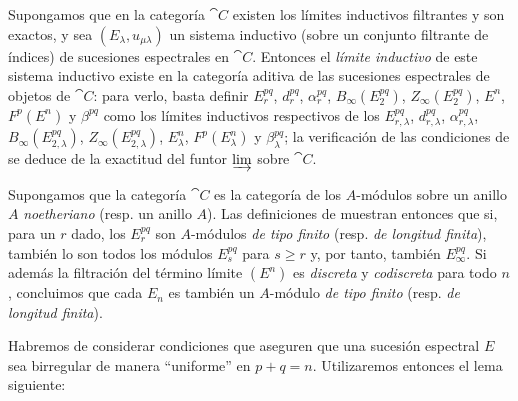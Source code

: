 \documentclass[oneside]{amsart}
\renewcommand{\geq}{\geqslant}
\let\EGAOriginalLabel\label
\renewcommand{\label}[1]{\phantomsection\EGAOriginalLabel{#1}}
\begin{document}
\begin{env}[11.1.7]
\label{0.11.1.7}
Supongamos que en la categoría $\cat{C}$ existen los límites inductivos filtrantes y son exactos, y sea $(E_\lambda,u_{\mu\lambda})$ un sistema inductivo (sobre un conjunto filtrante de índices) de sucesiones espectrales en $\cat{C}$.
Entonces el \emph{límite inductivo} de este sistema inductivo existe en la categoría aditiva de las sucesiones espectrales de objetos de $\cat{C}$: para verlo, basta definir $E_r^{pq}$, $d_r^{pq}$, $\alpha_r^{pq}$, $B_\infty(E_2^{pq})$, $Z_\infty(E_2^{pq})$, $E^n$, $F^p(E^n)$ y $\beta^{pq}$ como los límites inductivos respectivos de los $E_{r,\lambda}^{pq}$, $d_{r,\lambda}^{pq}$, $\alpha_{r,\lambda}^{pq}$, $B_\infty(E_{2,\lambda}^{pq})$, $Z_\infty(E_{2,\lambda}^{pq})$, $E_\lambda^n$, $F^p(E_\lambda^n)$ y $\beta_\lambda^{pq}$; la verificación de las condiciones de  se deduce de la exactitud del funtor $\varinjlim$ sobre $\cat{C}$.
\end{env}

\begin{remark}[11.1.8]
\label{0.11.1.8}
Supongamos que la categoría $\cat{C}$ es la categoría de los $A$-módulos sobre un anillo $A$ \emph{noetheriano} (resp. un anillo $A$).
Las definiciones de  muestran entonces que si, para un $r$ dado, los $E_r^{pq}$ son $A$-módulos \emph{de tipo finito} (resp. \emph{de longitud finita}), también lo son todos los módulos $E_s^{pq}$ para $s\geq r$ y, por tanto, también $E_\infty^{pq}$.
Si además la filtración del término límite $(E^n)$ es \emph{discreta} y \emph{codiscreta} para todo $n$, concluimos que cada $E_n$ es también un $A$-módulo \emph{de tipo finito} (resp. \emph{de longitud finita}).
\end{remark}

\begin{env}[11.1.9]
\label{0.11.1.9}
Habremos de considerar condiciones que aseguren que una sucesión espectral $E$ sea birregular de manera ``uniforme'' en $p+q=n$.
Utilizaremos entonces el lema siguiente:
\end{env}
\end{document}
